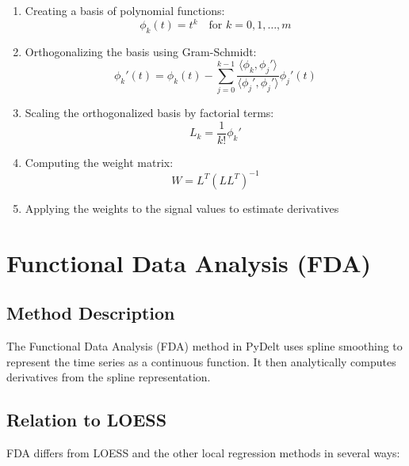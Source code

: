 \documentclass{article}
\begin{document}
\begin{enumerate}
    \item Creating a basis of polynomial functions:
    \begin{equation}
        \phi_k(t) = t^k \quad \text{for } k = 0, 1, \ldots, m
    \end{equation}
    
    \item Orthogonalizing the basis using Gram-Schmidt:
    \begin{equation}
        \phi_k'(t) = \phi_k(t) - \sum_{j=0}^{k-1} \frac{\langle \phi_k, \phi_j' \rangle}{\langle \phi_j', \phi_j' \rangle} \phi_j'(t)
    \end{equation}
    
    \item Scaling the orthogonalized basis by factorial terms:
    \begin{equation}
        L_k = \frac{1}{k!} \phi_k'
    \end{equation}
    
    \item Computing the weight matrix:
    \begin{equation}
        W = L^T (L L^T)^{-1}
    \end{equation}
    
    \item Applying the weights to the signal values to estimate derivatives
\end{enumerate}

\section{Functional Data Analysis (FDA)}

\subsection{Method Description}

The Functional Data Analysis (FDA) method in PyDelt uses spline smoothing to represent the time series as a continuous function. It then analytically computes derivatives from the spline representation.

\subsection{Relation to LOESS}

FDA differs from LOESS and the other local regression methods in several ways:
\end{document}
